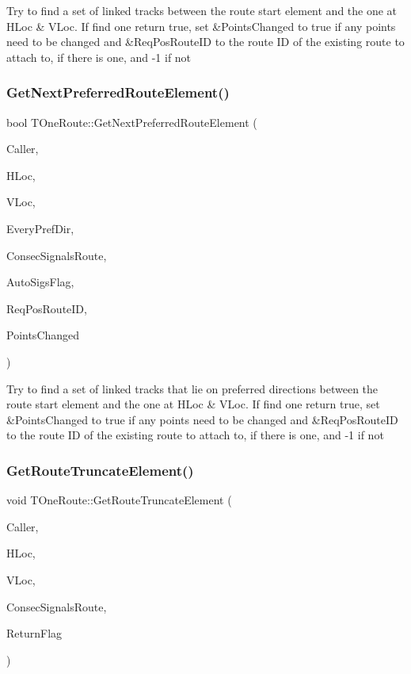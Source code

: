 Try to find a set of linked tracks between the route start element and the one at H\+Loc \& V\+Loc. If find one return true, set \&Points\+Changed to true if any points need to be changed and \&Req\+Pos\+Route\+ID to the route ID of the existing route to attach to, if there is one, and -\/1 if not \mbox{\label{class_t_one_route_af1794f576d8aff59f83992afc1c5acc2}} 
\subsubsection{\texorpdfstring{Get\+Next\+Preferred\+Route\+Element()}{GetNextPreferredRouteElement()}}
{\footnotesize\ttfamily bool T\+One\+Route\+::\+Get\+Next\+Preferred\+Route\+Element (\begin{DoxyParamCaption}\item[{int}]{Caller,  }\item[{int}]{H\+Loc,  }\item[{int}]{V\+Loc,  }\item[{\mbox{\hyperlink{class_t_one_pref_dir}{T\+One\+Pref\+Dir}} $\ast$}]{Every\+Pref\+Dir,  }\item[{bool}]{Consec\+Signals\+Route,  }\item[{bool}]{Auto\+Sigs\+Flag,  }\item[{\mbox{\hyperlink{class_i_d_int}{I\+D\+Int}} \&}]{Req\+Pos\+Route\+ID,  }\item[{bool \&}]{Points\+Changed }\end{DoxyParamCaption})}

Try to find a set of linked tracks that lie on preferred directions between the route start element and the one at H\+Loc \& V\+Loc. If find one return true, set \&Points\+Changed to true if any points need to be changed and \&Req\+Pos\+Route\+ID to the route ID of the existing route to attach to, if there is one, and -\/1 if not \mbox{\label{class_t_one_route_ae131609dd8248dae2d7b699ab8777202}} 
\subsubsection{\texorpdfstring{Get\+Route\+Truncate\+Element()}{GetRouteTruncateElement()}}
{\footnotesize\ttfamily void T\+One\+Route\+::\+Get\+Route\+Truncate\+Element (\begin{DoxyParamCaption}\item[{int}]{Caller,  }\item[{int}]{H\+Loc,  }\item[{int}]{V\+Loc,  }\item[{bool}]{Consec\+Signals\+Route,  }\item[{T\+Truncate\+Return\+Type \&}]{Return\+Flag }\end{DoxyParamCaption})}

